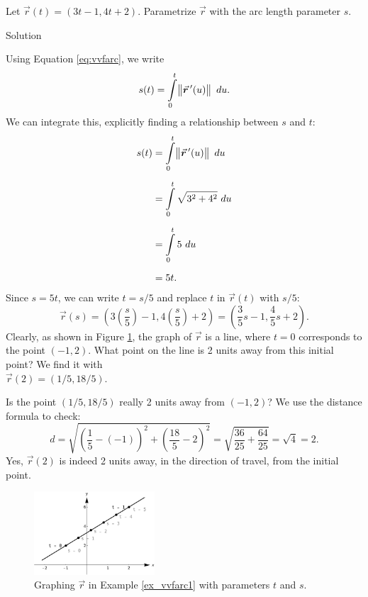 \begin{example}\label{ex_vvfarc1}
Let $\vec r(t) = \left( 3t-1,4t+2\right)$. Parametrize $\vec r$ with the arc length parameter $s$.

Solution 

Using Equation \eqref{eq:vvfarc}, we write
$$s(t) = \int\limits_0^t \norm{\vec r\,'(u)}\ du.$$
We can integrate this, explicitly finding a relationship between $s$ and $t$:
\allowdisplaybreaks
\begin{align*}
s(t) &= \int\limits_0^t \norm{\vec r\,'(u)}\ du \\[0.2cm]
			&= \int\limits_0^t \sqrt{3^2+4^2}\ du\\[0.2cm]
			&= \int\limits_0^t 5\ du\\[0.2cm]
			&= 5t.
\end{align*}
Since $s=5t$, we can write $t=s/5$ and replace $t$ in $\vec r(t)$ with $s/5$:
$$\vec r(s) = \left( 3\left(\dfrac{s}{5}\right)-1, 4\left(\dfrac{s}{5}\right)+2\right) = \left( \frac35s-1,\frac45s+2\right).$$
Clearly, as shown in Figure \ref{fig_vector_fun_14}, the graph of $\vec r$ is a line, where $t=0$ corresponds to the point $(-1,2)$. What point on the line is 2 units away from this initial point? We find it with \\ $\vec r(2) = \left( 1/5, 18/5\right)$. 


Is the point $(1/5,18/5)$ really 2 units away from $(-1,2)$? We use the distance formula to check:
$$d = \sqrt{\left(\frac15-(-1)\right)^2+ \left(\frac{18}5-2\right)^2} = \sqrt{\frac{36}{25}+\frac{64}{25}} = \sqrt{4}=2.$$
Yes, $\vec r(2)$ is indeed 2 units away, in the direction of travel, from the initial point.

\begin{figure}[H]
	\begin{center}
			\includegraphics[width=0.4\textwidth]{fig_vector_fun_14}
	\caption{Graphing $\vec r$ in Example \ref{ex_vvfarc1} with parameters $t$ and $s$.}
	\label{fig_vector_fun_14}
	\end{center}
\end{figure}

\end{example}


